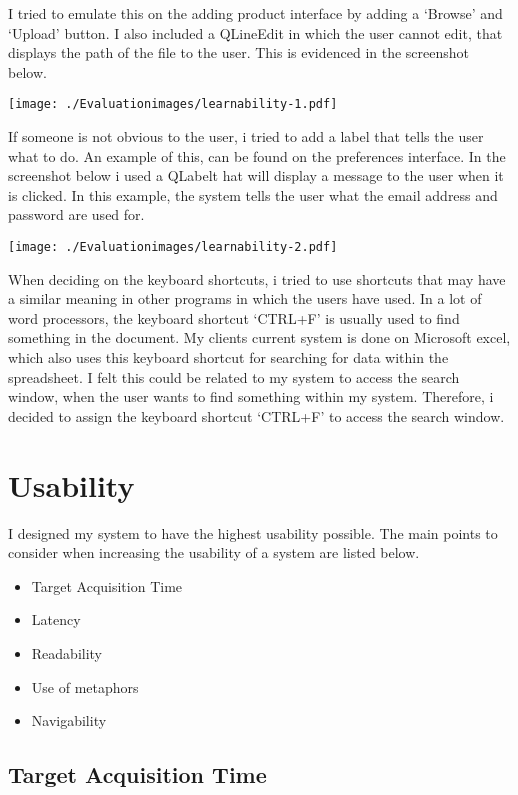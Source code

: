 I tried to emulate this on the adding product interface by adding a `Browse' and `Upload' button. I also included a QLineEdit in which the user cannot edit, that displays the path of the file to the user. This is evidenced in the screenshot below.

\texttt{[image: ./Evaluationimages/learnability-1.pdf]}

If someone is not obvious to the user, i tried to add a label that tells the user what to do. An example of this, can be found on the preferences interface.
In the screenshot below i used a QLabelt hat will display a message to the user when it is clicked. In this example, the system tells the user what the email address and password are used for.

\texttt{[image: ./Evaluationimages/learnability-2.pdf]}

When deciding on the keyboard shortcuts, i tried to use shortcuts that may have a similar meaning in other programs in which the users have used. In a lot of word processors, the keyboard shortcut `CTRL+F' is usually used to find something in the document. My clients current system is done on Microsoft excel, which also uses this keyboard shortcut for searching for data within the spreadsheet. I felt this could be related to my system to access the search window, when the user wants to find something within my system. Therefore, i decided to assign the keyboard shortcut `CTRL+F' to access the search window.


\pagebreak
\section{Usability}

I designed my system to have the highest usability possible. The main points to consider when increasing the usability of a system are listed below.

\begin{itemize}
	\item{Target Acquisition Time}
	\item{Latency}
	\item{Readability}
	\item{Use of metaphors}
	\item{Navigability} 
\end{itemize}

\subsection{Target Acquisition Time}

